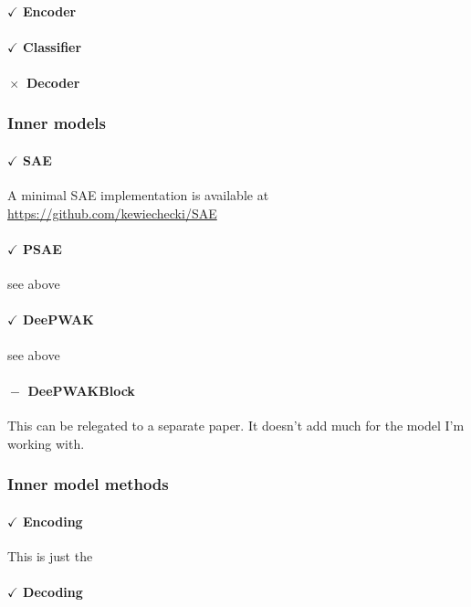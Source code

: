 \paragraph{$\boxed{\checkmark}$ Encoder}

\paragraph{$\boxed{\checkmark}$ Classifier}

\paragraph{$\boxed{\times}$ Decoder}


\subsubsection{Inner models}

\paragraph{$\boxed{\checkmark}$ SAE}
A minimal SAE implementation is available at
\url{https://github.com/kewiechecki/SAE}

\paragraph{$\boxed{\checkmark}$ PSAE}
see above

\paragraph{$\boxed{\checkmark}$ DeePWAK}
see above

\paragraph{$\boxed{-}$ DeePWAKBlock}
This can be relegated to a separate paper.
It doesn't add much for the model I'm working with.

\subsubsection{Inner model methods}

\paragraph{$\boxed{\checkmark}$ Encoding}
This is just the 
\paragraph{$\boxed{\checkmark}$ Decoding}

